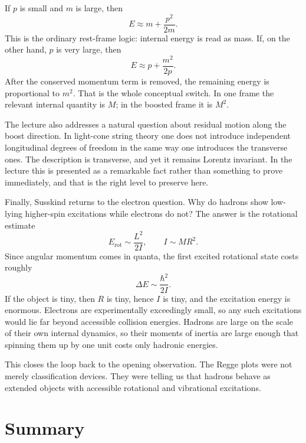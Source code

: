 If \(p\) is small and \(m\) is large, then
\begin{equation}
E \approx m+\frac{p^2}{2m}.
\end{equation}
This is the ordinary rest-frame logic: internal energy is read as mass. If, on the other hand, \(p\) is very large, then
\begin{equation}
E \approx p+\frac{m^2}{2p}.
\end{equation}
After the conserved momentum term is removed, the remaining energy is proportional to \(m^2\). That is the whole conceptual switch. In one frame the relevant internal quantity is \(M\); in the boosted frame it is \(M^2\).

The lecture also addresses a natural question about residual motion along the boost direction. In light-cone string theory one does not introduce independent longitudinal degrees of freedom in the same way one introduces the transverse ones. The description is transverse, and yet it remains Lorentz invariant. In the lecture this is presented as a remarkable fact rather than something to prove immediately, and that is the right level to preserve here.

Finally, Susskind returns to the electron question. Why do hadrons show low-lying higher-spin excitations while electrons do not? The answer is the rotational estimate
\begin{equation}
E_{\mathrm{rot}} \sim \frac{L^2}{2I},
\qquad
I \sim M R^2.
\end{equation}
Since angular momentum comes in quanta, the first excited rotational state costs roughly
\begin{equation}
\Delta E \sim \frac{\hbar^2}{2I}.
\end{equation}
If the object is tiny, then \(R\) is tiny, hence \(I\) is tiny, and the excitation energy is enormous. Electrons are experimentally exceedingly small, so any such excitations would lie far beyond accessible collision energies. Hadrons are large on the scale of their own internal dynamics, so their moments of inertia are large enough that spinning them up by one unit costs only hadronic energies.

This closes the loop back to the opening observation. The Regge plots were not merely classification devices. They were telling us that hadrons behave as extended objects with accessible rotational and vibrational excitations.

\section{Summary}

